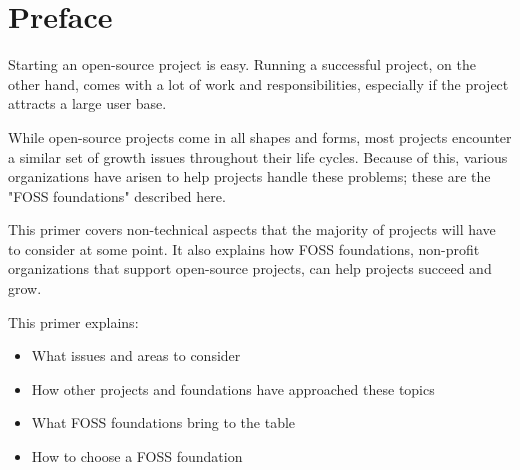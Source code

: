 


\chapter*{Preface}

Starting an open-source project is easy.  Running a successful project, on the other hand, comes with a lot of work and responsibilities, especially if the project attracts a large user base.

While open-source projects come in all shapes and forms, most projects encounter a similar set of growth issues throughout their life cycles.  Because of this, various organizations have arisen to help projects handle these problems; these are the "FOSS foundations" described here.

This primer covers non-technical aspects that the majority of projects will have to consider at some point.  It also explains how FOSS foundations, non-profit organizations that support open-source projects, can help projects succeed and grow.

This primer explains:

\begin{itemize}

\item What issues and areas to consider

\item How other projects and foundations have approached these topics

\item What FOSS foundations bring to the table

\item How to choose a FOSS foundation

\end{itemize}

